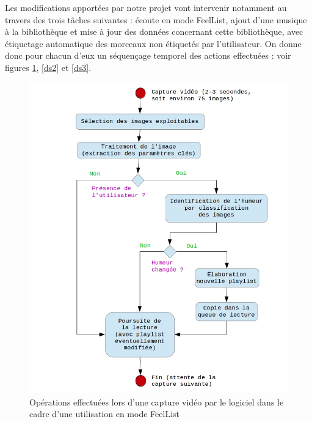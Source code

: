 Les modifications apportées par notre projet vont intervenir notamment au travers des trois tâches suivantes : écoute en mode FeelList, ajout d'une musique à la bibliothèque et mise à jour des données concernant cette bibliothèque, avec étiquetage automatique des morceaux non étiquetés par l'utilisateur.
On donne donc pour chacun d'eux un séquençage temporel des actions effectuées : voir figures \ref{ds1}, \ref{ds2} et \ref{ds3}.

\begin{figure}[htp]
\centering
\includegraphics[scale=0.5]{./images/SchemaCaptureVideo2.jpg}
\caption{Opérations effectuées lors d'une capture vidéo par le logiciel dans le cadre d'une utilisation en mode FeelList}
\label{ds1}
\end{figure}

